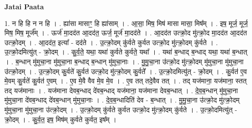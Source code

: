 \documentclass[17pt]{extarticle}
\begin{document}
\textbf{Jatai Paata} \newline

1. न हि हि न न हि । . ह्या॑सा मासाꣳ॒॒ हि ह्या॑साम् । . आ॒सा॒ मिष॒ मिष॑ मासा मासा॒ मिष᳚म् । . इष॒ मूर्ज॒ मूर्ज॒ मिष॒ मिष॒ मूर्ज᳚म् । . ऊर्ज॑ मा॒दद॑त आ॒दद॑त॒ ऊर्ज॒ मूर्ज॑ मा॒दद॑ते । . आ॒दद॑त उत्क्रो॒द मु॑त्क्रो॒द मा॒दद॑त आ॒दद॑त उत्क्रो॒दम् । . आ॒दद॑त॒ इत्या᳚ - दद॑ते । . उ॒त्क्रो॒दम् कु॑र्वते कुर्वत उत्क्रो॒द मु॑त्क्रो॒दम् कु॑र्वते । . उ॒त्क्रो॒दमित्यु॑त् - क्रो॒दम् । . कु॒र्व॒ते॒ यथा॒ यथा॑ कुर्वते कुर्वते॒ यथा᳚ । . यथा॑ ब॒न्धाद् ब॒न्धाद् यथा॒ यथा॑ ब॒न्धात् । . ब॒न्धान् मु॑मुचा॒ना मु॑मुचा॒ना ब॒न्धाद् ब॒न्धान् मु॑मुचा॒नाः । . मु॒मु॒चा॒ना उ॑त्क्रो॒द मु॑त्क्रो॒दम् मु॑मुचा॒ना मु॑मुचा॒ना उ॑त्क्रो॒दम् । . उ॒त्क्रो॒दम् कु॒र्वते॑ कु॒र्वत॑ उत्क्रो॒द मु॑त्क्रो॒दम् कु॒र्वते᳚ । . उ॒त्क्रो॒दमित्यु॑त् - क्रो॒दम् । . कु॒र्वत॑ ए॒व मे॒वम् कु॒र्वते॑ कु॒र्वत॑ ए॒वम् । . ए॒व मे॒वै वैव मे॒व मे॒व । . ए॒व तत् तदे॒वैव तत् । . तद् यज॑माना॒ यज॑माना॒ स्तत् तद् यज॑मानाः । . यज॑माना देवब॒न्धाद् दे॑वब॒न्धाद् यज॑माना॒ यज॑माना देवब॒न्धात् । . दे॒व॒ब॒न्धान् मु॑मुचा॒ना मु॑मुचा॒ना दे॑वब॒न्धाद् दे॑वब॒न्धान् मु॑मुचा॒नाः । . दे॒व॒ब॒न्धादिति॑ देव - ब॒न्धात् । . मु॒मु॒चा॒ना उ॑त्क्रो॒द मु॑त्क्रो॒दम् मु॑मुचा॒ना मु॑मुचा॒ना उ॑त्क्रो॒दम् । . उ॒त्क्रो॒दम् कु॑र्वते कुर्वत उत्क्रो॒द मु॑त्क्रो॒दम् कु॑र्वते । . उ॒त्क्रो॒दमित्यु॑त् - क्रो॒दम् । . कु॒र्व॒त॒ इष॒ मिष॑म् कुर्वते कुर्वत॒ इष᳚म् । \newline
\end{document}
